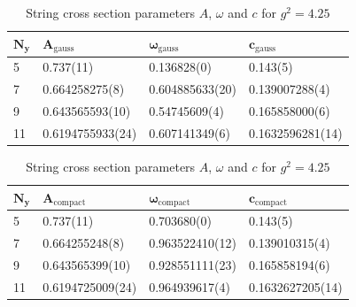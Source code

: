 \begin{table}[!hb]
\centering
\begin{tabular}{llll}
    $\mathbf{N_y}$ & $\mathbf{A_\mathrm{gauss}}$ & $\mathbf{\omega_\mathrm{gauss}}$ & $\mathbf{c_\mathrm{gauss}}$ \\ \hline
   5 & 0.737(11) & 0.136828(0) & 0.143(5) \\
   7 & 0.664258275(8) & 0.604885633(20) & 0.139007288(4) \\
   9 & 0.643565593(10) & 0.54745609(4) & 0.165858000(6) \\
   11 & 0.6194755933(24) & 0.607141349(6) & 0.1632596281(14) \\
\end{tabular}
\begin{tabular}{llll}
    $\mathbf{N_y}$ & $\mathbf{A_\mathrm{compact}}$ & $\mathbf{\omega_\mathrm{compact}}$ & $\mathbf{c_\mathrm{compact}}$ \\ \hline
   5 & 0.737(11) & 0.703680(0) & 0.143(5) \\
   7 & 0.664255248(8) & 0.963522410(12) & 0.139010315(4) \\
   9 & 0.643565399(10) & 0.928551111(23) & 0.165858194(6) \\
   11 & 0.6194725009(24) & 0.964939617(4) & 0.1632627205(14) \\
\end{tabular}
\caption{String cross section parameters $A$, $\omega$ and $c$ for $g^2=4.25$}
\end{table}
